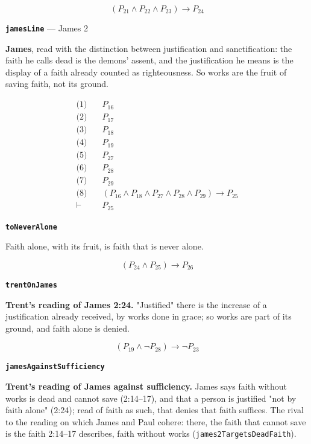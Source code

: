 \documentclass[11pt]{article}
\begin{document}
\[(P_{21} \land P_{22} \land P_{23}) \rightarrow P_{24}\]
\par\medskip\noindent\textbf{\texttt{james\allowbreak{}Line}} --- James 2\par\nobreak\noindent
\textbf{James}, read with the distinction between justification and sanctification: the faith he calls dead is the demons' assent, and the justification he means is the display of a faith already counted as righteousness. So works are the fruit of saving faith, not its ground.

\begin{align*}
  \text{(1)} \quad & P_{16} \\
  \text{(2)} \quad & P_{17} \\
  \text{(3)} \quad & P_{18} \\
  \text{(4)} \quad & P_{19} \\
  \text{(5)} \quad & P_{27} \\
  \text{(6)} \quad & P_{28} \\
  \text{(7)} \quad & P_{29} \\
  \text{(8)} \quad & (P_{16} \land P_{18} \land P_{27} \land P_{28} \land P_{29}) \rightarrow P_{25} \\
  \vdash \quad & P_{25}
\end{align*}
\par\medskip\noindent\textbf{\texttt{to\allowbreak{}Never\allowbreak{}Alone}}\par\nobreak\noindent
Faith alone, with its fruit, is faith that is never alone.

\[(P_{24} \land P_{25}) \rightarrow P_{26}\]
\par\medskip\noindent\textbf{\texttt{trent\allowbreak{}On\allowbreak{}James}}\par\nobreak\noindent
\textbf{Trent's reading of James 2:24.} "Justified" there is the increase of a justification already received, by works done in grace; so works are part of its ground, and faith alone is denied.

\[(P_{19} \land \lnot P_{28}) \rightarrow \lnot P_{23}\]
\par\medskip\noindent\textbf{\texttt{james\allowbreak{}Against\allowbreak{}Sufficiency}}\par\nobreak\noindent
\textbf{Trent's reading of James against sufficiency.} James says faith without works is dead and cannot save (2:14–17), and that a person is justified "not by faith alone" (2:24); read of faith as such, that denies that faith suffices. The rival to the reading on which James and Paul cohere: there, the faith that cannot save is the faith 2:14–17 describes, faith without works (\texttt{james2\allowbreak{}Targets\allowbreak{}Dead\allowbreak{}Faith}).
\end{document}
